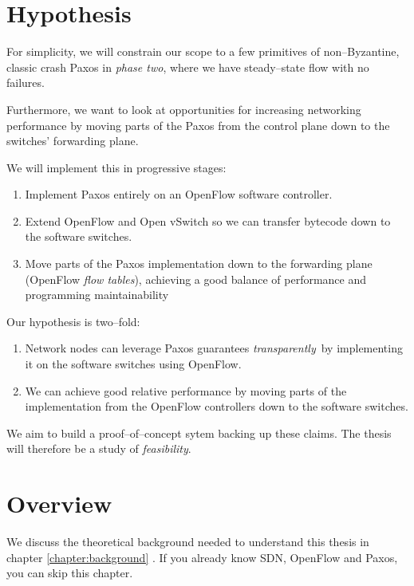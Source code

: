 \section{Hypothesis}

For simplicity, we will constrain our scope to a few primitives of
non--Byzantine, classic crash Paxos in \textit{phase two}, where we have
steady--state flow with no failures.

Furthermore, we want to look at opportunities for increasing networking
performance by moving parts of the Paxos from the control plane down to the
switches' forwarding plane.

We will implement this in progressive stages:

\begin{enumerate}
\item Implement Paxos entirely on an OpenFlow software controller.
\item Extend OpenFlow and Open vSwitch so we can transfer bytecode down to
the software switches.
\item Move parts of the Paxos implementation down to the forwarding plane
(OpenFlow \textit{flow tables}), achieving a good balance of performance and
programming maintainability
\end{enumerate}

Our hypothesis is two--fold:

\begin{enumerate}
\item Network nodes can leverage Paxos guarantees \textit{transparently} by
implementing it on the software switches using OpenFlow.
\item We can achieve good relative performance by moving parts of the
implementation from the OpenFlow controllers down to the software switches.
\end{enumerate}

We aim to build a proof--of--concept sytem backing up these claims.  The
thesis will therefore be a study of \textit{feasibility}.

\section{Overview}

We discuss the theoretical background needed to understand this thesis in
chapter \ref{chapter:background} .  If you already know \acs{SDN},
OpenFlow and Paxos, you can skip this chapter.

